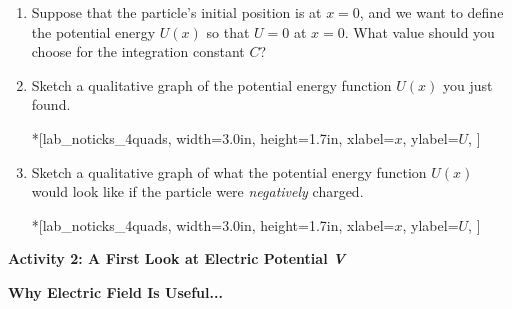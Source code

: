 \begin{enumerate}[labparts]
\item Suppose that the particle's initial position is at $x=0$, and we want to define the potential energy $U(x)$ so that $U=0$ at $x=0$.  What value should you choose for the integration constant $C$?
\answerspace{0.3in}

\item Sketch a qualitative graph of the potential energy function $U(x)$ you just found.
\begin{lab_axis}*[lab_noticks_4quads,
	width={3.0in}, height={1.7in},
	xlabel={$x$},
	ylabel={$U$},
	]
\end{lab_axis}

\item Sketch a qualitative graph of what the potential energy function $U(x)$ would look like if the particle were \textit{negatively} charged.

\begin{lab_axis}*[lab_noticks_4quads,
	width={3.0in}, height={1.7in},
	xlabel={$x$},
	ylabel={$U$},
	]
\end{lab_axis}

\end{enumerate}

\pagebreak[3]
\textbf{Activity 2: A First Look at Electric Potential \textit{V}}

\textbf{Why Electric Field Is Useful...}


